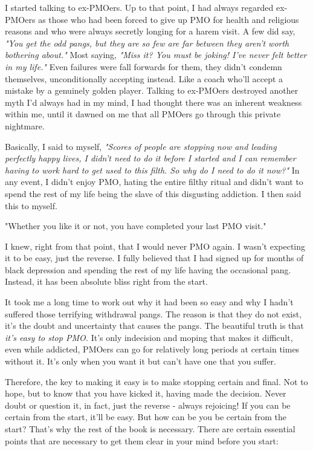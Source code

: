 \documentclass[easypeasy]{subfiles}
\begin{document}
I started talking to ex-PMOers. Up to that point, I had always regarded ex-PMOers as those who had been forced to give up PMO for health and religious reasons and who were always secretly longing for a harem visit. A few did say, \textit{"You get the odd pangs, but they are so few are far between they aren't worth bothering about."} Most saying, \textit{"Miss it? You must be joking! I've never felt better in my life."} Even failures were fall forwards for them, they didn't condemn themselves, unconditionally accepting instead. Like a coach who'll accept a mistake by a genuinely golden player. Talking to ex-PMOers destroyed another myth I'd always had in my mind, I had thought there was an inherent weakness within me, until it dawned on me that all PMOers go through this private nightmare.

Basically, I said to myself, \textit{"Scores of people are stopping now and leading perfectly happy lives, I didn't need to do it before I started and I can remember having to work hard to get used to this filth. So why do I need to do it now?"} In any event, I didn't enjoy PMO, hating the entire filthy ritual and didn't want to spend the rest of my life being the slave of this disgusting addiction. I then said this to myself.

  {\huge "Whether you like it or not, you have completed your last PMO visit."}

I knew, right from that point, that I would never PMO again. I wasn't expecting it to be easy, just the reverse. I fully believed that I had signed up for months of black depression and spending the rest of my life having the occasional pang. Instead, it has been absolute bliss right from the start.

It took me a long time to work out why it had been so easy and why I hadn't suffered those terrifying withdrawal pangs. The reason is that they do not exist, it's the doubt and uncertainty that causes the pangs. The beautiful truth is that \textit{it's easy to stop PMO.} It's only indecision and moping that makes it difficult, even while addicted, PMOers can go for relatively long periods at certain times without it. It's only when you want it but can't have one that you suffer.

Therefore, the key to making it easy is to make stopping certain and final. Not to hope, but to know that you have kicked it, having made the decision. Never doubt or question it, in fact, just the reverse - always rejoicing! If you can be certain from the start, it'll be easy. But how can be you be certain from the start? That's why the rest of the book is necessary. There are certain essential points that are necessary to get them clear in your mind before you start:
\end{document}
